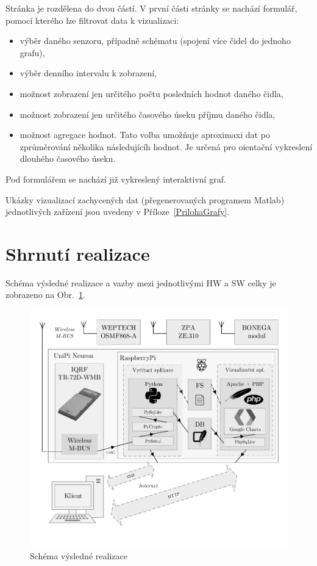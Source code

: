 Stránka je rozdělena do dvou částí. V první části stránky se nachází formulář, pomocí kterého lze filtrovat data k vizualizaci:
\begin{itemize}
	\item výběr daného senzoru, případně schématu (spojení více čidel do jednoho grafu),
	\item výběr denního intervalu k zobrazení,
	\item možnost zobrazení jen určitého počtu posledních hodnot daného čidla,
	\item možnost zobrazení jen určitého časového úseku příjmu daného čidla,
	\item možnost agregace hodnot. Tato volba umožňuje aproximaxi dat po zprůměrování několika následujícíh hodnot. Je určená pro oientační vykreslení dlouhého časového úseku.
\end{itemize}
 
Pod formulářem se nachází již vykreslený interaktivní graf.

Ukázky vizualizací zachycených dat (přegenerovaných programem Matlab) jednotlivých zařízení jsou uvedeny v Příloze~\ref{PrilohaGrafy}.

\section{Shrnutí realizace}
Schéma výsledné realizace a vazby mezi jednotlivými HW a SW celky je zobrazeno na Obr.~\ref{SchemaFinal}.
\begin{figure}[!ht]
	\vspace{-10pt}
  \begin{center}
    \includegraphics[scale=0.85]{obrazky/aplikace_schema}
  \end{center}
	\vspace{-50pt}
  \caption{Schéma výsledné realizace}
	\label{SchemaFinal}
	\vspace{-5pt}
\end{figure}



